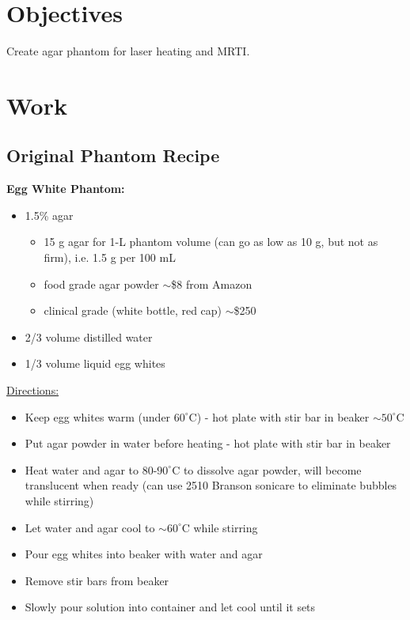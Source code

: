 \documentclass{article}         %
\theoremstyle{definition}
\theoremstyle{remark}
\begin{document}

\section{Objectives}\label{Objectives}

Create agar phantom for laser heating and MRTI.

\section{Work}\label{Work}

\subsection{Original Phantom Recipe}

\textbf{Egg White Phantom:}
\begin{itemize}
	\item 1.5\% agar
	\begin{itemize}
		\item 15 g agar for 1-L phantom volume (can go as low as 10 g, but not as firm), i.e. 1.5 g per 100 mL
		\item food grade agar powder $\sim$\$8 from Amazon
		\item clinical grade (white bottle, red cap) $\sim$\$250
	\end{itemize}
	\item 2/3 volume distilled water
	\item 1/3 volume liquid egg whites
\end{itemize}
\underline{Directions:}
\begin{itemize}
	\item Keep egg whites warm (under $60^\circ \mathrm{C}$) - hot plate with stir bar in beaker $\sim 50^\circ \mathrm{C}$
	\item Put agar powder in water before heating - hot plate with stir bar in beaker
	\item Heat water and agar to $80$-$90^\circ \mathrm{C}$ to dissolve agar powder, will become translucent when ready (can use 2510 Branson sonicare to eliminate bubbles while stirring)
	\item Let water and agar cool to $\sim 60^\circ \mathrm{C}$ while stirring
	\item Pour egg whites into beaker with water and agar
	\item Remove stir bars from beaker
	\item Slowly pour solution into container and let cool until it sets
\end{itemize}
\end{document}
